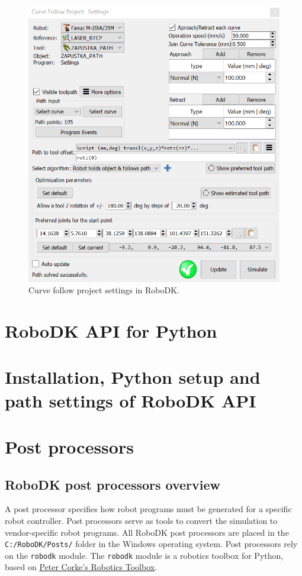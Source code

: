 \begin{figure}[h]
    \centering
    \includegraphics[width=0.9\linewidth]{img/curve_follow_settings.PNG}
    \caption{Curve follow project settings in RoboDK.}
    \label{fig:curvefollow}
\end{figure}

\section{RoboDK API for Python}

\section{Installation, Python setup and path settings of RoboDK API}

\section{Post processors}

\subsection{RoboDK post processors overview}

A post processor specifies how robot programs must be generated for a specific robot controller. Post processors serve as tools to convert the simulation to vendor-specific robot programs. All RoboDK post processors are placed in the \texttt{C:/RoboDK/Posts/} folder in the Windows operating system. Post processors rely on the \texttt{robodk} module. The \texttt{robodk} module is a robotics toolbox for Python, based on \href{http://petercorke.com/Robotics_Toolbox.html}{Peter Corke’s Robotics Toolbox}. 

